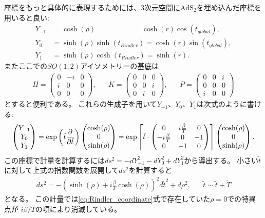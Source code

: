 座標をもっと具体的に表現するためには、3次元空間に$\mathrm{AdS}_2$を埋め込んだ座標を用いると良い:
\begin{align}
	Y_{-1} &= \cosh(\rho) \hspace{61pt} = \cosh(r)\cos(t_{global}),\nonumber\\
	Y_0    &= \sinh(\rho)\sinh(t_{Rindler}) = \cosh(r)\sin(t_{global}),\\
	Y_1    &= \sinh(\rho)\cosh(t_{Rindler}) = \sinh(r)\nonumber.
\end{align}
またここでの$SO(1,2)$アイソメトリーの基底は
\begin{align}
	H = \begin{pmatrix}
		0 & -i & 0\\
		i & 0 & 0\\
		0 & 0 & 0
	\end{pmatrix},\hspace{20pt}
	K = \begin{pmatrix}
		0 & 0 & 0\\
		0 & 0 & i\\
		0 & i & 0
	\end{pmatrix},\hspace{20pt}
	P = \begin{pmatrix}
		0 & 0 & i\\
		0 & 0 & 0\\
		i & 0 & 0
	\end{pmatrix}
\end{align}
とすると便利である。
これらの生成子を用いて$Y_{-1}$、$Y_0$、$Y_1$は次式のように書ける:
\begin{align}
	\begin{pmatrix} Y_{-1} \\ Y_0 \\ Y_1 \end{pmatrix}
	= \exp\left(\tilde{t}\frac{\partial}{\partial \tilde{t}}\right)\begin{pmatrix} \cosh(\rho) \\ 0 \\ \sinh(\rho) \end{pmatrix}
	= \exp\left[
		\tilde{t}\cdot\begin{pmatrix}
			0 & i\frac{\beta}{T} & 0\\
			-i\frac{\beta}{T} & 0 & -1\\
			0 & -1 & 0
		\end{pmatrix}
	\right]\begin{pmatrix} \cosh(\rho) \\ 0 \\ \sinh(\rho) \end{pmatrix}.
\end{align}
この座標で計量を計算するには$ds^2 = -dY_{-1}^2 - dY_0^2 + dY_1^2$から導出する。
小さい$\tilde{t}$に対して上式の指数関数を展開して$ds^2$を計算すると
\begin{align}
	ds^2
	= -\left(\sinh(\rho) + i\frac{\beta}{T}\cosh(\rho)\right)^2d\tilde{t}^2
		+ d\rho^2,\hspace{20pt}\tilde{t}\sim\tilde{t} + \tilde{T}
	\label{eq:embedded_metric}
\end{align}
となる。
この計量では\eqref{eq:Rindler_coordinate}式で存在していた$\rho=0$での特異点が
$i\beta / T$の項により消滅している。

